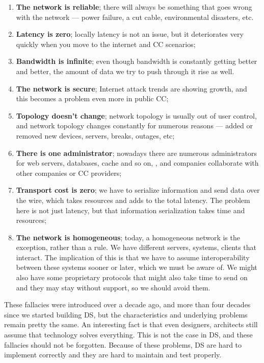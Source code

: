 \begin{enumerate}[start=1,label={(\bfseries \arabic*)}]\label{ds:8_fallacies}
	\item \textbf{The network is reliable}; there will always be something that goes wrong with the network --- power failure, a cut cable, environmental disasters, etc.
	\item \textbf{Latency is zero}; locally latency is not an issue, but it deteriorates very quickly when you move to the internet and CC scenarios;
	\item \textbf{Bandwidth is infinite}; even though bandwidth is constantly getting better and better, the amount of data we try to push through it rise as well.
	\item \textbf{The network is secure};  Internet attack trends are showing growth, and this becomes a problem even more in public CC;
	\item \textbf{Topology doesn't change}; network topology is usually out of user control, and network topology changes constantly for numerous reasons --- added or removed new devices, servers, breaks, outages, etc;
	\item \textbf{There is one administrator}; nowadays there are numerous administrators for web servers, databases, cache and so on, , and companies collaborate with other companies or CC providers;
	\item \textbf{Transport cost is zero}; we have to serialize information and send data over the wire, which takes resources and adds to the total latency. The problem here is not just latency, but that information serialization takes time and resources;
	\item \textbf{The network is homogeneous}; today, a homogeneous network is the exception, rather than a rule. We have different servers, systems, clients that interact. The implication of this is that we have to assume interoperability between these systems sooner or later, which we must be aware of. We might also have some proprietary protocols that might also take time to send on and they may stay without support, so we should avoid them.
\end{enumerate}

\noindent
These fallacies were introduced over a decade ago, and more than four decades since we started building DS, but the characteristics and underlying problems remain pretty the same. An interesting fact is that even designers, architects still assume that technology solves everything. This is not the case in DS, and these fallacies should not be forgotten. Because of these problems, DS are hard to implement correctly and they are hard to maintain and test properly.
%
%
